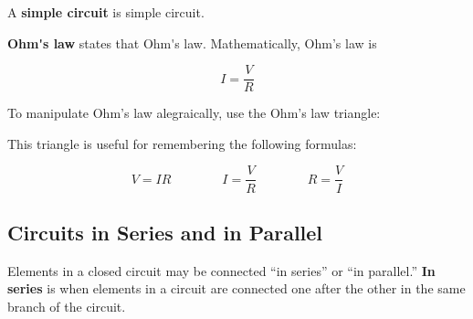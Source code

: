 \documentclass[dvipsnames]{article}
\begin{document}
A \textbf{\gls{simple circuit}} is \glsdesc{simple circuit}.

\begin{center}
\end{center}

\textbf{\gls{Ohm's law}} states that \glsdesc{Ohm's law}. Mathematically, Ohm's law is

\begin{equation*}
    I = \frac{V}{R}
\end{equation*}

To manipulate Ohm's law alegraically, use the Ohm's law triangle:

\begin{center}
\end{center}

This triangle is useful for remembering the following formulas:

\begin{equation*}
    V = IR \qquad \qquad
    I = \frac{V}{R} \qquad \qquad
    R = \frac{V}{I}
\end{equation*}


\subsection{Circuits in Series and in Parallel}

Elements in a closed circuit may be connected ``in series'' or ``in parallel.'' \textbf{In series} is when elements in a circuit are connected one after the other in the same branch of the circuit. 
\end{document}
